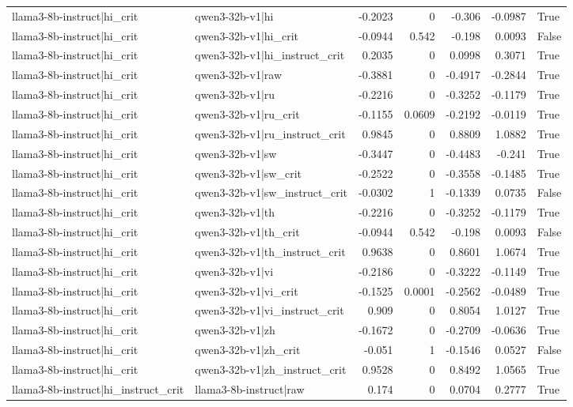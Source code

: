 \begin{table}
\begin{tabular}{l l r r r r l}
llama3-8b-instruct|hi_crit & qwen3-32b-v1|hi & -0.2023 & 0 & -0.306 & -0.0987 & True \\
llama3-8b-instruct|hi_crit & qwen3-32b-v1|hi_crit & -0.0944 & 0.542 & -0.198 & 0.0093 & False \\
llama3-8b-instruct|hi_crit & qwen3-32b-v1|hi_instruct_crit & 0.2035 & 0 & 0.0998 & 0.3071 & True \\
llama3-8b-instruct|hi_crit & qwen3-32b-v1|raw & -0.3881 & 0 & -0.4917 & -0.2844 & True \\
llama3-8b-instruct|hi_crit & qwen3-32b-v1|ru & -0.2216 & 0 & -0.3252 & -0.1179 & True \\
llama3-8b-instruct|hi_crit & qwen3-32b-v1|ru_crit & -0.1155 & 0.0609 & -0.2192 & -0.0119 & True \\
llama3-8b-instruct|hi_crit & qwen3-32b-v1|ru_instruct_crit & 0.9845 & 0 & 0.8809 & 1.0882 & True \\
llama3-8b-instruct|hi_crit & qwen3-32b-v1|sw & -0.3447 & 0 & -0.4483 & -0.241 & True \\
llama3-8b-instruct|hi_crit & qwen3-32b-v1|sw_crit & -0.2522 & 0 & -0.3558 & -0.1485 & True \\
llama3-8b-instruct|hi_crit & qwen3-32b-v1|sw_instruct_crit & -0.0302 & 1 & -0.1339 & 0.0735 & False \\
llama3-8b-instruct|hi_crit & qwen3-32b-v1|th & -0.2216 & 0 & -0.3252 & -0.1179 & True \\
llama3-8b-instruct|hi_crit & qwen3-32b-v1|th_crit & -0.0944 & 0.542 & -0.198 & 0.0093 & False \\
llama3-8b-instruct|hi_crit & qwen3-32b-v1|th_instruct_crit & 0.9638 & 0 & 0.8601 & 1.0674 & True \\
llama3-8b-instruct|hi_crit & qwen3-32b-v1|vi & -0.2186 & 0 & -0.3222 & -0.1149 & True \\
llama3-8b-instruct|hi_crit & qwen3-32b-v1|vi_crit & -0.1525 & 0.0001 & -0.2562 & -0.0489 & True \\
llama3-8b-instruct|hi_crit & qwen3-32b-v1|vi_instruct_crit & 0.909 & 0 & 0.8054 & 1.0127 & True \\
llama3-8b-instruct|hi_crit & qwen3-32b-v1|zh & -0.1672 & 0 & -0.2709 & -0.0636 & True \\
llama3-8b-instruct|hi_crit & qwen3-32b-v1|zh_crit & -0.051 & 1 & -0.1546 & 0.0527 & False \\
llama3-8b-instruct|hi_crit & qwen3-32b-v1|zh_instruct_crit & 0.9528 & 0 & 0.8492 & 1.0565 & True \\
llama3-8b-instruct|hi_instruct_crit & llama3-8b-instruct|raw & 0.174 & 0 & 0.0704 & 0.2777 & True \\

\end{tabular}
\end{table}
